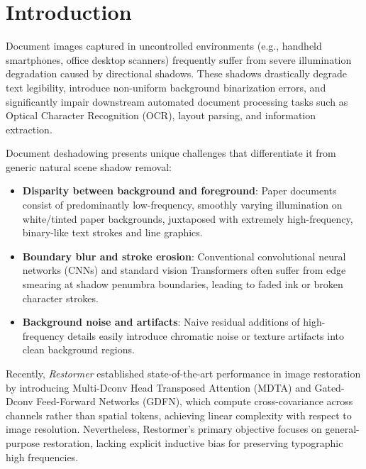 \documentclass[conference]{IEEEtran}
\begin{document}
\section{Introduction}
Document images captured in uncontrolled environments (e.g., handheld smartphones, office desktop scanners) frequently suffer from severe illumination degradation caused by directional shadows. These shadows drastically degrade text legibility, introduce non-uniform background binarization errors, and significantly impair downstream automated document processing tasks such as Optical Character Recognition (OCR), layout parsing, and information extraction.

Document deshadowing presents unique challenges that differentiate it from generic natural scene shadow removal:
\begin{itemize}
    \item \textbf{Disparity between background and foreground}: Paper documents consist of predominantly low-frequency, smoothly varying illumination on white/tinted paper backgrounds, juxtaposed with extremely high-frequency, binary-like text strokes and line graphics.
    \item \textbf{Boundary blur and stroke erosion}: Conventional convolutional neural networks (CNNs) and standard vision Transformers often suffer from edge smearing at shadow penumbra boundaries, leading to faded ink or broken character strokes.
    \item \textbf{Background noise and artifacts}: Naive residual additions of high-frequency details easily introduce chromatic noise or texture artifacts into clean background regions.
\end{itemize}

Recently, \textit{Restormer} \cite{zamir2022restormer} established state-of-the-art performance in image restoration by introducing Multi-Dconv Head Transposed Attention (MDTA) and Gated-Dconv Feed-Forward Networks (GDFN), which compute cross-covariance across channels rather than spatial tokens, achieving linear complexity with respect to image resolution. Nevertheless, Restormer's primary objective focuses on general-purpose restoration, lacking explicit inductive bias for preserving typographic high frequencies.
\end{document}
